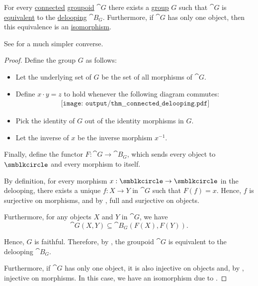 \begin{proposition}\label{thm:connected_delooping}
  For every \hyperref[def:connected_category]{connected} \hyperref[def:groupoid]{groupoid} \( \cat{G} \) there exists a \hyperref[def:group]{group} \( G \) such that \( \cat{G} \) is \hyperref[def:category_equivalence]{equivalent} to the \hyperref[def:monoid_delooping]{delooping} \( \cat{B}_G \). Furthermore, if \( \cat{G} \) has only one object, then this equivalence is an \hyperref[rem:category_similarity/isomorphism]{isomorphism}.

  See  for a much simpler converse.
\end{proposition}
\begin{proof}
  Define the group \( G \) as follows:
  \begin{itemize}
    \item Let the underlying set of \( G \) be the set of all morphisms of \( \cat{G} \).
    \item Define \( x \cdot y = z \) to hold whenever the following diagram commutes:
    \begin{equation}\label{eq:thm:connected_delooping/mult}
      \begin{aligned}
        \texttt{[image: output/thm\_\_connected\_delooping.pdf]}
      \end{aligned}
    \end{equation}
    \item Pick the identity of \( G \) out of the identity morphisms in \( G \).
    \item Let the inverse of \( x \) be the inverse morphism \( x^{-1} \).
  \end{itemize}

  Finally, define the functor \( F: \cat{G} \to \cat{B}_G \), which sends every object to \( \anon \) and every morphism to itself.

  By definition, for every morphism \( x: \anon \to \anon \) in the delooping, there exists a unique \( f: X \to Y \) in \( \cat{G} \) such that \( F(f) = x \). Hence, \( f \) is surjective on morphisms, and by , full and surjective on objects.

  Furthermore, for any objects \( X \) and \( Y \) in \( \cat{G} \), we have
  \begin{equation*}
    \cat{G}(X, Y) \subseteq \cat{B}_G(F(X), F(Y)).
  \end{equation*}

  Hence, \( G \) is faithful. Therefore, by , the groupoid \( \cat{G} \) is equivalent to the delooping \( \cat{B}_G \).

  Furthermore, if \( \cat{G} \) has only one object, it is also injective on objects and, by , injective on morphisms. In this case, we have an isomorphism due to .
\end{proof}

